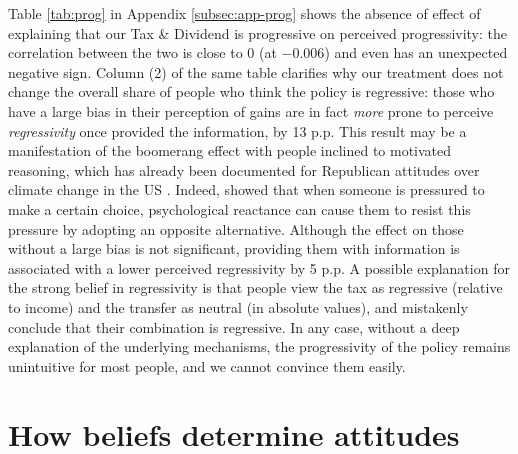 \documentclass[12pt]{article} %
\begin{document}
Table \ref{tab:prog} in Appendix \ref{subsec:app-prog} shows the absence of effect of explaining that our Tax \& Dividend is progressive on perceived progressivity: the correlation between the two is close to 0 (at $-0.006$) and even has an unexpected negative sign. Column (2) of the same table clarifies why our treatment does not change the overall share of people who think the policy is regressive: those who have a large bias in their perception of gains are in fact \textit{more} prone to perceive \textit{regressivity} once provided the information, by 13 p.p. This result may be a manifestation of the boomerang effect with people inclined to motivated reasoning, which has already been documented for Republican attitudes over climate change in the US \citep{zhou_boomerangs_2016}. Indeed, \citet{hovland_communication_1953} showed that when someone is pressured to make a certain choice, psychological reactance \citep[theorized by][]{brehm_theory_1966} can cause them to resist this pressure by adopting an opposite alternative.  Although the effect on those without a large bias is not significant, providing them with information is associated with a lower perceived regressivity by 5 p.p. A possible explanation for the strong belief in regressivity is that people view the tax as regressive (relative to income) and the transfer as neutral (in absolute values), and mistakenly conclude that their combination is regressive. In any case, without a deep explanation of the underlying mechanisms, the progressivity of the policy remains unintuitive for most people, and we cannot convince them easily.





\section{How beliefs determine attitudes \label{sec:motives5}}
\end{document}
